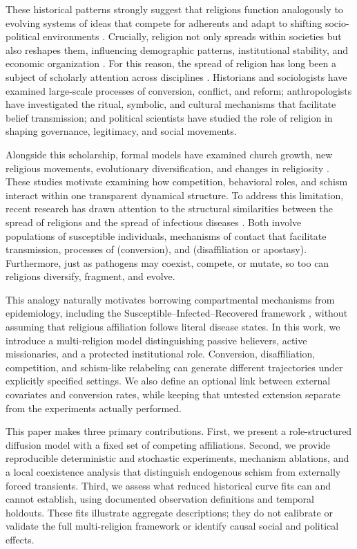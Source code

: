 \documentclass[11pt,a4paper]{article}
\begin{document}
These historical patterns strongly suggest that religions function analogously to evolving systems of ideas that compete for adherents and adapt to shifting socio-political environments \cite{intro_27}. Crucially, religion not only spreads within societies but also reshapes them, influencing demographic patterns, institutional stability, and economic organization \cite{intro_28}. For this reason, the spread of religion has long been a subject of scholarly attention across disciplines \cite{intro_29,intro_30,intro_31,intro_32}. Historians and sociologists have examined large-scale processes of conversion, conflict, and reform; anthropologists have investigated the ritual, symbolic, and cultural mechanisms that facilitate belief transmission; and political scientists have studied the role of religion in shaping governance, legitimacy, and social movements. 

Alongside this scholarship, formal models have examined church growth, new religious movements, evolutionary diversification, and changes in religiosity \cite{intro_33,upal2005simulating,religion_sir,gore2018forecasting}. These studies motivate examining how competition, behavioral roles, and schism interact within one transparent dynamical structure. To address this limitation, recent research has drawn attention to the structural similarities between the spread of religions and the spread of infectious diseases \cite{intro_33,intro_35}. Both involve populations of susceptible individuals, mechanisms of contact that facilitate transmission, processes of  (conversion), and  (disaffiliation or apostasy). Furthermore, just as pathogens may coexist, compete, or mutate, so too can religions diversify, fragment, and evolve.

This analogy naturally motivates borrowing compartmental mechanisms from epidemiology, including the Susceptible--Infected--Recovered framework \cite{first_sir}, without assuming that religious affiliation follows literal disease states. In this work, we introduce a multi-religion model distinguishing passive believers, active missionaries, and a protected institutional role. Conversion, disaffiliation, competition, and schism-like relabeling can generate different trajectories under explicitly specified settings. We also define an optional link between external covariates and conversion rates, while keeping that untested extension separate from the experiments actually performed.

This paper makes three primary contributions. First, we present a role-structured diffusion model with a fixed set of competing affiliations. Second, we provide reproducible deterministic and stochastic experiments, mechanism ablations, and a local coexistence analysis that distinguish endogenous schism from externally forced transients. Third, we assess what reduced historical curve fits can and cannot establish, using documented observation definitions and temporal holdouts. These fits illustrate aggregate descriptions; they do not calibrate or validate the full multi-religion framework or identify causal social and political effects.
\end{document}
